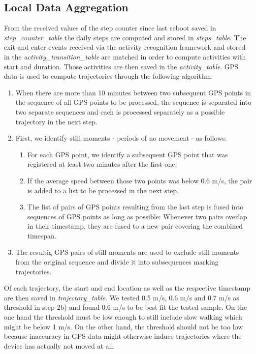 \subsection{Local Data Aggregation}\label{local-data-aggregation}
From the received values of the step counter since last reboot saved in \textit{step\_counter\_table} the daily steps are computed and stored in \textit{steps\_table}. The exit and enter events received via the activity recognition framework and stored in the \textit{activity\_transition\_table} are matched in order to compute activities with start and duration. Those activities are then saved in the \textit{activity\_table}.
GPS data is used to compute trajectories through the following algorithm:
\begin{enumerate}
	\item When there are more than 10 minutes between two subsequent GPS points in the sequence of all GPS points to be processed, the sequence is separated into two separate sequences and each is processed separately as a possible trajectory in the next step.
	\item First, we identify still moments - periods of no movement - as follows:
	\begin{enumerate}
		\item For each GPS point, we identify a subsequent GPS point that was registered at least two minutes after the first one.
		\item If the average speed between those two points was below 0.6 m/s, the pair is added to a list to be processed in the next step.
		\item The list of pairs of GPS points resulting from the last step is fused into sequences of GPS points as long as possible: Whenever two pairs overlap in their timestamp, they are fused to a new pair covering the combined timespan.
	\end{enumerate}
	\item The resultig GPS pairs of still moments are used to exclude still moments from the original sequence and divide it into subsequences marking trajectories.
\end{enumerate}
Of each trajectory, the start and end location as well as the respective timestamp are then saved in \textit{trajectory\_table}. We tested 0.5 m/s, 0.6 m/s and 0.7 m/s as threshold in step 2b) and found 0.6 m/s to be best fit the tested sample. On the one hand the threshold must be low enough to still include slow walking which might be below 1 m/s. On the other hand, the threshold should not be too low because inaccuracy in GPS data might otherwise induce trajectories where the device has actually not moved at all.

